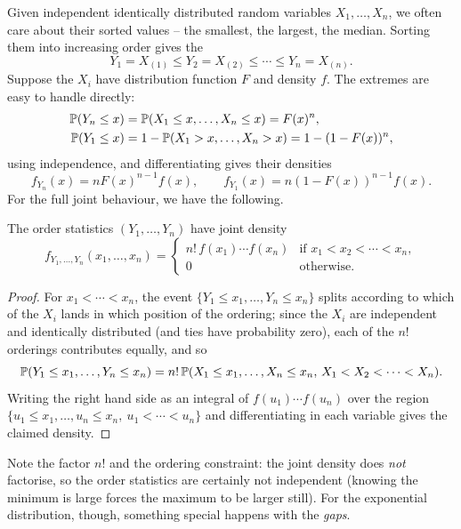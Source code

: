 \documentclass[a4paper]{scrartcl}
\begin{document}
Given independent identically distributed random variables $X_1, \dots, X_n$, we often care about their sorted values -- the smallest, the largest, the median. Sorting them into increasing order gives the 
$$
Y_1 = X_{(1)} \leq Y_2 = X_{(2)} \leq \cdots \leq Y_n = X_{(n)}.
$$
Suppose the $X_i$ have distribution function $F$ and density $f$. The extremes are easy to handle directly:
\begin{align*}
	\mathbb{P}(Y_n \leq x) &= \mathbb{P}(X_1 \leq x, \dots, X_n \leq x) = F(x)^n, \\
	\mathbb{P}(Y_1 \leq x) &= 1 - \mathbb{P}(X_1 > x, \dots, X_n > x) = 1 - (1 - F(x))^n,
\end{align*}
using independence, and differentiating gives their densities
$$
f_{Y_n}(x) = nF(x)^{n - 1}f(x), \qquad f_{Y_1}(x) = n(1 - F(x))^{n-1} f(x).
$$
For the full joint behaviour, we have the following.

\begin{proposition}
	The order statistics $(Y_1, \dots, Y_n)$ have joint density
	$$
	f_{Y_1, \dots, Y_n}(x_1, \dots, x_n) = \begin{cases}
		n! \, f(x_1) \cdots f(x_n) & \text{if } x_1 < x_2 < \cdots < x_n, \\
		0 & \text{otherwise.}
	\end{cases}
	$$
\end{proposition}
\begin{proof}
	For $x_1 < \cdots < x_n$, the event $\{Y_1 \leq x_1, \dots, Y_n \leq x_n\}$ splits according to which of the $X_i$ lands in which position of the ordering; since the $X_i$ are independent and identically distributed (and ties have probability zero), each of the $n!$ orderings contributes equally, and so
	$$
	\mathbb{P}(Y_1 \leq x_1, \dots, Y_n \leq x_n) = n! \,\mathbb{P}(X_1 \leq x_1, \dots, X_n \leq x_n, \, X_1 < X_2 < \cdots < X_n).
	$$
	Writing the right hand side as an integral of $f(u_1)\cdots f(u_n)$ over the region $\{u_1 \leq x_1, \dots, u_n \leq x_n,\ u_1 < \cdots < u_n\}$ and differentiating in each variable gives the claimed density.
\end{proof}

Note the factor $n!$ and the ordering constraint: the joint density does \emph{not} factorise, so the order statistics are certainly not independent (knowing the minimum is large forces the maximum to be larger still). For the exponential distribution, though, something special happens with the \emph{gaps}.
\end{document}
